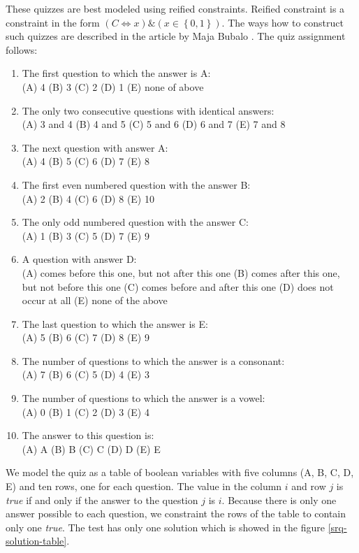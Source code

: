 These quizzes are best modeled using reified constraints. Reified constraint is a constraint
in the form $(C \Leftrightarrow x) \& \left(x \in \left\{0,1\right\}\right)$. The ways how to construct
such quizzes are described in the article by Maja Bubalo \cite{jios:bubalo}.
The quiz assignment follows:

\begin{enumerate}
	\item The first question to which the answer is A:\\
		(A) 4 (B) 3 (C) 2 (D) 1 (E) none of above
	\item The only two consecutive questions with identical answers: \\
		(A) 3 and 4 (B) 4 and 5 (C) 5 and 6 (D) 6 and 7 (E) 7 and 8
	\item The next question with answer A: \\
		(A) 4 (B) 5 (C) 6 (D) 7 (E) 8
	\item The first even numbered question with the answer B: \\
		(A) 2 (B) 4 (C) 6 (D) 8 (E) 10 
	\item The only odd numbered question with the answer C: \\
		(A) 1 (B) 3 (C) 5 (D) 7 (E) 9
	\item A question with answer D: \\
		(A) comes before this one, but not after this one (B) comes after this one, but not before this one (C) comes before and after this one (D) does not occur at all (E) none of the above
	\item The last question to which the answer is E: \\
		(A) 5 (B) 6 (C) 7 (D) 8 (E) 9
	\item The number of questions to which the answer is a consonant: \\
		(A) 7 (B) 6 (C) 5 (D) 4 (E) 3
	\item The number of questions to which the answer is a vowel: \\
		(A) 0 (B) 1 (C) 2 (D) 3 (E) 4
	\item The answer to this question is: \\
		(A) A (B) B (C) C (D) D (E) E
\end{enumerate}

We model the quiz as a table of boolean variables with five columns (A, B, C, D, E) 
and ten rows, one for each question. The value in the column $i$ and row $j$ is
{\em true} if and only if the answer to the question $j$ is $i$. Because there is only one
answer possible to each question, we constraint the rows of the table to contain
only one {\em true}. The test has only one solution which is showed in the figure 
\ref{srq-solution-table}.  
 
